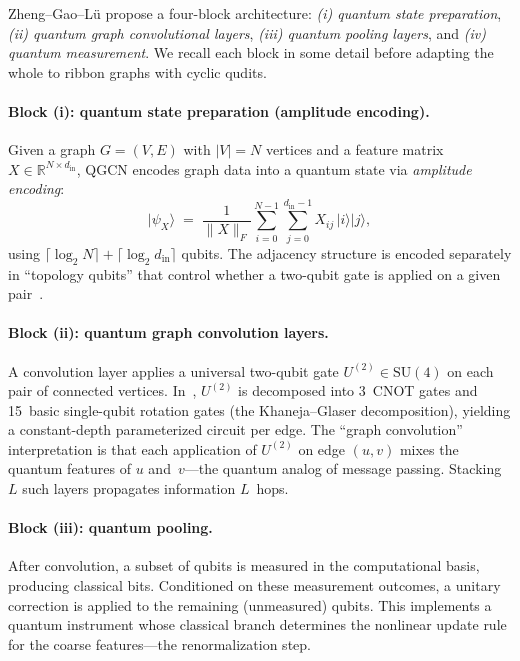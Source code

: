 \documentclass[11pt,oneside]{amsbook}
\numberwithin{equation}{section}
\theoremstyle{plain}
\theoremstyle{definition}
\theoremstyle{remark}
\newcommand{\ket}[1]{\lvert #1 \rangle}
\begin{document}
Zheng--Gao--L\"u \cite{Zheng2021QGCN} propose a four-block architecture:
\emph{(i) quantum state preparation}, \emph{(ii) quantum graph convolutional layers},
\emph{(iii) quantum pooling layers}, and \emph{(iv) quantum measurement}.
We recall each block in some detail before adapting the whole to ribbon graphs with cyclic qudits.

\paragraph{Block (i): quantum state preparation (amplitude encoding).}
Given a graph $G=(V,E)$ with $|V|=N$ vertices and a feature matrix $X\in\mathbb{R}^{N\times d_{\mathrm{in}}}$,
QGCN encodes graph data into a quantum state via \emph{amplitude encoding}:
\[
  \ket{\psi_X}
  \;=\;
  \frac{1}{\|X\|_F}\sum_{i=0}^{N-1}\sum_{j=0}^{d_{\mathrm{in}}-1} X_{ij}\,\ket{i}\ket{j},
\]
using $\lceil\log_2 N\rceil+\lceil\log_2 d_{\mathrm{in}}\rceil$ qubits.
The adjacency structure is encoded separately in ``topology qubits'' that control whether a
two-qubit gate is applied on a given pair~\cite{Zheng2021QGCN}.

\paragraph{Block (ii): quantum graph convolution layers.}
A convolution layer applies a universal two-qubit gate $U^{(2)}\in\mathrm{SU}(4)$ on each pair of connected
vertices.  In~\cite{Zheng2021QGCN}, $U^{(2)}$ is decomposed into 3~CNOT gates and 15~basic single-qubit
rotation gates (the Khaneja--Glaser decomposition), yielding a constant-depth parameterized circuit per edge.
The ``graph convolution'' interpretation is that each application of $U^{(2)}$ on edge $(u,v)$ mixes the
quantum features of $u$ and~$v$---the quantum analog of message passing.
Stacking $L$ such layers propagates information $L$~hops.

\paragraph{Block (iii): quantum pooling.}
After convolution, a subset of qubits is measured in the computational basis, producing classical bits.
Conditioned on these measurement outcomes, a unitary correction is applied to the remaining (unmeasured) qubits.
This implements a quantum instrument whose classical branch determines the nonlinear update rule for the coarse
features---the renormalization step.
\end{document}
